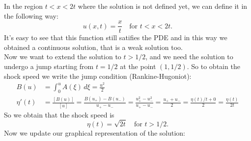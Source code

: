 In the region \(t < x < 2t\) where the solution is not defined yet, we can define it in the following way:
\[
    u(x,t) = \frac{x}{t} \quad \text{for } t < x < 2t.
\]
It's easy to see that this function still satifies the PDE and in this way we
obtained a continuous solution, that is a weak solution too.\\ Now we want to
extend the solution to \(t > 1/2\), and we need the solution to undergo a jump
starting from \(t = 1/2\) at the point \((1, 1/2)\). So to obtain the shock
speed we write the jump condition (Rankine-Hugoniot):
\[
    \begin{split}
        B(u)     & = \int_0^u A(\xi) \, d\xi = \frac{u^2}{2}                                                                                                                     \\
        \eta'(t) & = \frac{[B(u)]}{[u]} = \frac{B(u_+) - B(u_-)}{u_+ - u_-} = \frac{u_+^2 - u_-^2}{u_+ - u_-} = \frac{u_+ + u_-}{2} = \frac{\eta(t)/t + 0}{2} = \frac{\eta(t)}{2t}
    \end{split}
\]
So we obtain that the shock speed is
\[
    \eta(t) = \sqrt{2t} \quad \text{for } t > 1/2.
\]
Now we update our graphical representation of the solution:
\begin{center}
\end{center}
